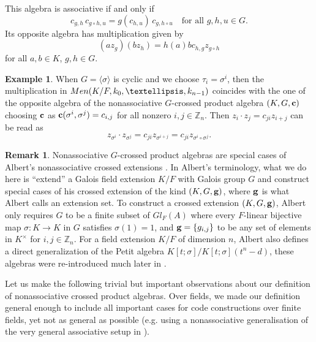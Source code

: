 \documentclass[11pt]{amsart}
\theoremstyle{plain}
\theoremstyle{definition}
\newtheorem{example}[theorem]{Example}
\newtheorem{remark}[theorem]{Remark}
\begin{document}
This algebra is associative if and only if
\[
c_{g,h}\,c_{g\circ h,u}
  = g(c_{h,u})\,c_{g,h\circ u}
  \quad \text{for all } g,h,u \in G.
\]
Its opposite algebra has  multiplication given by
$$(az_g)(b z_h)=h(a) b c_{h,g} z_{g\circ h}$$
for all $a, b\in K$, $g,h\in G$.

\begin{example}
When $G=\langle \sigma \rangle$ is cyclic and we choose $\tau_i=\sigma^i$,  then the multiplication in ${\rm Men}(K/F, k_0,\dots,k_{n-1})$ coincides with the one of the opposite algebra of the nonassociative  $G$-crossed product algebra $(K,G, {\bf c})$
choosing  ${\bf c}$  as ${\bf c}(\sigma^i, \sigma^j)=c_{i,j}$ for all nonzero $ i,j\in\mathbb{Z}_n$.
Then $z_i\cdot  z_j=c_{ji}z_{i+j}$ can be read as
$$z_{\sigma^i}\cdot  z_{\sigma^j}=c_{ji}z_{\sigma^{i+j}}=c_{ji}z_{\sigma^{i}\circ \sigma^{j}}.$$
\end{example}

 \begin{remark}
Nonassociative $G$-crossed product algebras are special cases of Albert's nonassociative crossed extensions \cite{A1}.  In Albert's terminology,
what we do here is  ``extend'' a Galois field extension $K/F$ with Galois group $G$ and  construct special cases of  his crossed extension of the kind $(K,G,{\bf g})$, where ${\bf g}$ is what Albert calls an extension set. To construct a crossed extension $(K,G,{\bf g})$, Albert only requires $G$ to be a finite subset of $Gl_F(A)$ where every $F$-linear bijective map $\sigma:K\to K$ in $G$  satisfies $\sigma(1)=1$,
and ${\bf g}=\{g_{i,j}\}$ to be any set of elements in $K^\times$ for  $i,j\in \mathbb{Z}_n$. For a field extension $K/F$ of dimension $n$, Albert also defines a direct generalization of the Petit algebra $K[t;\sigma]/K[t;\sigma](t^n-d)$, these algebras were re-introduced much later in \cite{P66}.
 \end{remark}

 Let us make the following trivial but important observations about our definition of nonassociative crossed product algebras. Over fields, we made our definition general enough to include all important cases for code constructions over finite fields, yet not as general as possible (e.g. using a nonassociative generalisation of the very general associative setup  in \cite{OeLun}).
\end{document}
